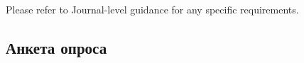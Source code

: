 \documentclass[pdflatex,sn-mathphys-num]{sn-jnl}%
\theoremstyle{thmstyleone}%
\theoremstyle{thmstyletwo}%
\theoremstyle{thmstylethree}%
\begin{document}
Please refer to Journal-level guidance for any specific requirements.

\begin{appendices}

\section{Анкета опроса}\label{secA1}





\end{appendices}


\end{document}
